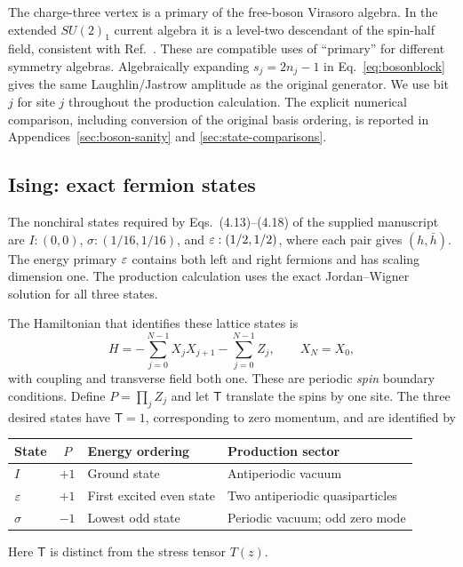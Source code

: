 The charge-three vertex is a primary of the free-boson Virasoro algebra.
In the extended $SU(2)_1$ current algebra it is a level-two descendant of
the spin-half field, consistent with Ref.~\cite{Herwerth}. These are
compatible uses of ``primary'' for different symmetry algebras.
Algebraically expanding $s_j=2n_j-1$ in Eq.~\eqref{eq:bosonblock} gives the
same Laughlin/Jastrow amplitude as the original generator. We use bit $j$
for site $j$ throughout the production calculation. The explicit numerical
comparison, including conversion of the original basis ordering, is
reported in Appendices~\ref{sec:boson-sanity} and
\ref{sec:state-comparisons}.



\subsection{Ising: exact fermion states}
\label{sec:ising-production}
The nonchiral states required by Eqs.~(4.13)--(4.18) of the supplied
manuscript~\cite{theory} are
$I:(0,0)$, $\sigma:(1/16,1/16)$, and $\varepsilon:(1/2,1/2)$, where each
pair gives $(h,\bar h)$. The energy primary $\varepsilon$ contains both
left and right fermions and has scaling dimension one. The production
calculation uses the exact Jordan--Wigner solution for all three states.

The Hamiltonian that identifies these lattice states is
\begin{equation}
 H=-\sum_{j=0}^{N-1}X_jX_{j+1}-\sum_{j=0}^{N-1}Z_j,
 \qquad X_N=X_0,
 \label{eq:Hising}
\end{equation}
with coupling and transverse field both one. These are periodic
\emph{spin} boundary conditions. Define $P=\prod_j Z_j$ and let
$\mathsf T$ translate the spins by one site. The three desired states
have $\mathsf T=1$, corresponding to zero momentum, and are identified by
\begin{center}
\begin{tabular}{lcll}\toprule
State & $P$ & Energy ordering & Production sector\\\midrule
$I$ & $+1$ & Ground state & Antiperiodic vacuum\\
$\varepsilon$ & $+1$ & First excited even state & Two antiperiodic quasiparticles\\
$\sigma$ & $-1$ & Lowest odd state & Periodic vacuum; odd zero mode\\
\bottomrule\end{tabular}
\end{center}
Here $\mathsf T$ is distinct from the stress tensor $T(z)$.

